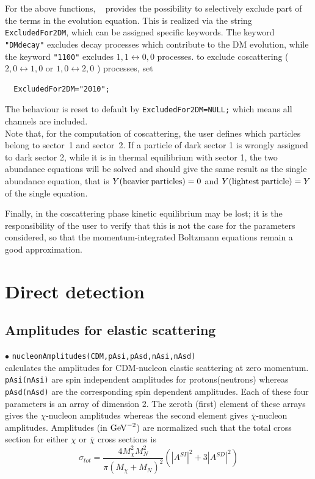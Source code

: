 \documentclass[12pt,a4paper]{article}
\begin{document}
For the above functions, \micro~ provides the possibility to selectively exclude part of the terms in the evolution equation. 
This is realized via the string 
{\tt ExcludedFor2DM}, which can be assigned specific keywords. The keyword \verb|"DMdecay"| excludes decay processes 
which contribute to the DM evolution, while the keyword  \verb|"1100"| excludes $1,1 \leftrightarrow 0,0$ processes. 
to exclude coscattering ($2,0 \leftrightarrow 1,0$ or $1,0 \leftrightarrow 2,0$ ) processes, set 
\begin{verbatim}
  ExcludedFor2DM="2010";
\end{verbatim}
The behaviour is reset to default by {\tt ExcludedFor2DM=NULL;} which means all channels are included. \\
                       
Note  that, for the computation of coscattering, the user defines which particles belong to sector~1 and sector~2. If a particle of dark sector 1 is wrongly assigned to dark sector 2, while it is in thermal equilibrium with sector 1, the two abundance equations will be solved and should give the same result as the single abundance equation, that is $Y{\rm(heavier\:particles)}=0$ and $Y{\rm (lightest\:particle)}=Y$ of the single equation. 

Finally, in the coscattering phase kinetic equilibrium may be lost; 
it is the responsibility of the user to verify that this is not the case for the parameters considered, so that 
the momentum-integrated Boltzmann equations remain a good approximation. \\


\section{Direct detection}
\subsection{Amplitudes for elastic scattering}
\noindent
 $\bullet$ \verb|nucleonAmplitudes(CDM,pAsi,pAsd,nAsi,nAsd)|\\
calculates the amplitudes for CDM-nucleon elastic
scattering at zero momentum. \verb|pAsi(nAsi)| are spin
independent amplitudes for protons(neutrons) whereas
\verb|pAsd(nAsd)| are the corresponding spin dependent amplitudes.
Each of these four parameters is an array of 
dimension 2. The zeroth (first) element of these arrays gives the
$\chi$-nucleon amplitudes whereas the second element gives
$\overline{\chi}$-nucleon amplitudes. Amplitudes (in ${\rm GeV}^{-2}$) are normalized
such that the total cross section for either $\chi$ or $\overline
\chi$ cross sections is
\begin{equation}
\sigma_{tot}=\frac{4M_{\chi}^2 M_N^2}{\pi(M_{\chi}+M_N)^2}(|A^{SI}|^2+3|A^{SD}|^2)
\label{eq:norm}
\end{equation}
\end{document}
